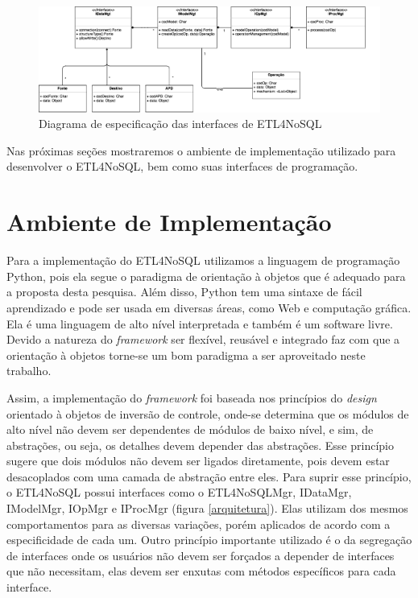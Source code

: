 \begin{figure}[h!]
	\centering
	\includegraphics[scale=0.49]{fig/interfaces.png}
	\caption{Diagrama de especificação das interfaces de ETL4NoSQL}
	\label{interfaces}
\end{figure}

Nas próximas seções mostraremos o ambiente de implementação utilizado para desenvolver o ETL4NoSQL, bem como suas interfaces de programação.


\section{Ambiente de Implementação}

Para a implementação do ETL4NoSQL utilizamos a linguagem de programação Python, pois ela segue o paradigma de orientação à objetos que é adequado para a proposta desta pesquisa. Além disso, Python tem uma sintaxe de fácil aprendizado e pode ser usada em diversas áreas, como Web e computação gráfica. Ela é uma linguagem de alto nível interpretada e também é um software livre. Devido a natureza do \textit{framework} ser flexível, reusável e integrado faz com que a orientação à objetos torne-se um bom paradigma a ser aproveitado neste trabalho.

Assim, a implementação do \textit{framework} foi baseada nos princípios do \textit{design} orientado à objetos de inversão de controle, onde-se determina que os módulos de alto nível não devem ser dependentes de módulos de baixo nível, e sim, de abstrações, ou seja, os detalhes devem depender das abstrações. Esse princípio sugere que dois módulos não devem ser ligados diretamente, pois devem estar desacoplados com uma camada de abstração entre eles. Para suprir esse princípio, o ETL4NoSQL possui interfaces como o ETL4NoSQLMgr, IDataMgr, IModelMgr, IOpMgr e IProcMgr (figura \ref{arquitetura}). Elas utilizam dos mesmos comportamentos para as diversas variações, porém aplicados de acordo com a especificidade de cada um. Outro princípio importante utilizado é o da segregação de interfaces onde os usuários não devem ser forçados a depender de interfaces que não necessitam, elas devem ser enxutas com métodos específicos para cada interface. 

